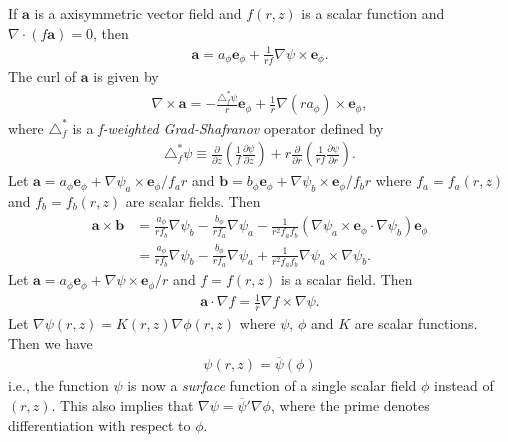 \documentclass[11pt, reqno]{amsart}
\newcommand{\pfrac}[2]{\frac{\partial #1}{\partial #2}}
\newcommand{\mvec}[1]{\mathbf{#1}}
\newcommand{\eep}{\mvec{e}_\phi}
\theoremstyle{definition}
\begin{document}
If $\mvec{a}$ is a axisymmetric vector field and $f(r,z)$ is a
scalar function and $\nabla \cdot (f\mvec{a}) = 0$, then
\begin{align}
  \mvec{a} = a_\phi \eep + \frac{1}{rf}\nabla\psi \times \eep. \label{id:divAF}
\end{align}
The curl of $\mvec{a}$ is given by
\begin{align}
  \nabla\times\mvec{a} = -\frac{\triangle^*_f\psi}{r}\eep
  + \frac{1}{r} \nabla(ra_\phi)\times\eep, \label{eq:curlaf}
\end{align}
where $\triangle^*_f$ is a \emph{f-weighted Grad-Shafranov} operator
defined by
\begin{align}
  \triangle^*_f\psi \equiv 
  \frac{\partial}{\partial z}\left(\frac{1}{f} \pfrac{\psi}{z}\right)
  + r \frac{\partial}{\partial r}\left(\frac{1}{rf} \pfrac{\psi}{r}\right).
\end{align}
Let $\mvec{a}=a_\phi\eep + \nabla\psi_a \times \eep/f_ar$ and
$\mvec{b}=b_\phi\eep + \nabla\psi_b \times \eep/f_br$ where
$f_a=f_a(r,z)$ and $f_b=f_b(r,z)$ are scalar fields. Then
\begin{align}
  \mvec{a}\times\mvec{b} &=
  \frac{a_\phi}{rf_b}\nabla\psi_b
  -
  \frac{b_\phi}{rf_a}\nabla\psi_a
  -\frac{1}{r^2f_af_b}(\nabla\psi_a \times \eep \cdot \nabla\psi_b)\eep \\
  &= \frac{a_\phi}{rf_b}\nabla\psi_b
  -
  \frac{b_\phi}{rf_a}\nabla\psi_a
  +\frac{1}{r^2f_af_b}\nabla\psi_a \times \nabla\psi_b.
\end{align}
Let $\mvec{a}=a_\phi\eep + \nabla\psi \times \eep/r$ and $f=f(r,z)$ is
a scalar field. Then
\begin{align}
  \mvec{a}\cdot\nabla f = \frac{1}{r} \nabla f \times \nabla{\psi}.
\end{align}
Let $\nabla \psi(r,z) = K(r,z) \nabla \phi(r,z)$ where $\psi$, $\phi$
and $K$ are scalar functions. Then we have
\begin{align}
  \psi(r,z) = \overline{\psi}(\phi)
\end{align}
i.e., the function $\psi$ is now a \emph{surface} function of a single
scalar field $\phi$ instead of $(r,z)$. This also implies that $\nabla
\psi = \overline{\psi}' \nabla\phi$, where the prime denotes
differentiation with respect to $\phi$.



\end{document}
